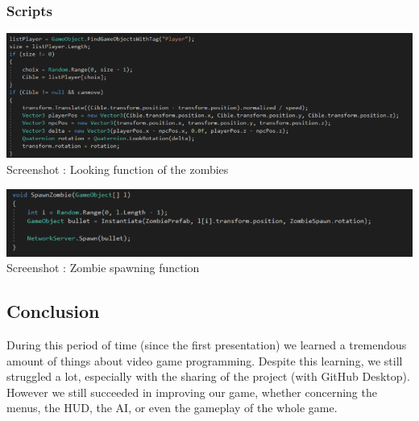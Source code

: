 \documentclass[12pt]{article}
\begin{document}
	\subsubsection{Scripts}
    
\begin{center}	
	\includegraphics[scale = 0.50]{looking_func.png}\\[1cm]
    Screenshot : Looking function of the zombies
\end{center}

\begin{center}	
	\includegraphics[scale = 0.60]{Zombi_spawn.png}\\[1cm]
    Screenshot : Zombie spawning function
\end{center}
\newpage

\subsection{Conclusion}
	During this period of time (since the first presentation) we learned a tremendous amount of things about video game programming.
    Despite this learning, we still struggled a lot, especially with the sharing of the project (with GitHub Desktop).
    However we still succeeded in improving our game, whether concerning the menus, the HUD, the AI, or even the gameplay of the whole game.
    
\newpage
\end{document}
